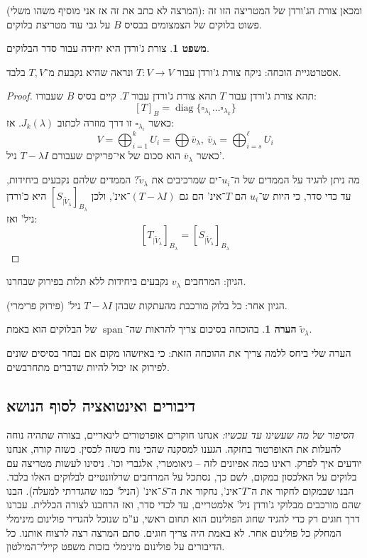 \documentclass[a4paper]{article}
\newcommand\ml    {\ell}
\DeclareMathOperator{\diag}    {diag}
\DeclareMathOperator{\Sp}      {span}
\newcommand\co        {\colon}
\renewcommand\lg      {\lambda}
\newcommand\tl    {\tilde}
\newcommand\csb[1]    {\left [ #1 \right ]}
\theoremstyle{definition}
\newtheorem{Theorem}{משפט}
\newtheorem{Remark}{הערה}
\newcommand\theo  [1] {\begin{Theorem}#1\end{Theorem}}
\newcommand\rmark [1] {\begin{Remark}#1\end{Remark}}
\begin{document}
	(המרצה לא כתב את זה אז אני מוסיף משהו משלי): ומכאן צורת הג'ורדן של המטריצה הזו זה פשוט בלוקים של הצמצומים בבסיס $B$ על גבי עוד מטריצת בלוקים. 
	
	\theo{צורת ג'ורדן היא יחידה עבור סדר הבלוקים. }אסטרטגיית הוכחה: ניקח צורת ג'ורדן עבור $T \co V \to V$ ונראה שהיא נקבעת מ־$T, V$ בלבד. 
	\begin{proof}
		תהא צורת ג'ורדן עבור $T$ תהא צורת ג'ורדן עבור $T$. קיים בסיס $B$ שעבורו: 
		\[ [T]_B = \diag\{\square_{\lg_1} \dots \square_{\lg_k}\} \]
		כאשר $\square_{\lg_i}$ זו דרך מוזרה לכתוב $J_k(\lg)$. 
		אז: 
		\[ V = \bigoplus_{i = 1}^{k} U_i = \bigoplus \bar v_{\lg}, \ \bar v_{\lg} = \bigoplus_{i = s}^{\ml} U_i \]
		כאשר $\bar v_{\lg}$ הוא סכום של אי־פריקים שעבורם $T - \lg I$ ניל'. 
		
		מה ניתן להגיד על הממדים של ה־$u_i$־ים שמרכיבים את $\tl v_\lg$? הממדים שלהם נקבעים ביחידות, עד כדי סדר, כי היות ש־$u_i$ הם $T$־אינ' הם גם $(T - \lg I)$־אינ', ולכן $[S_{|\tl V_\lg}]_{B_\lg}$ היא כ'ורדן ניל' ואז: 
		\[ \csb{T_{|\tl V_\lg}}_{B_\lg} = \csb{S_{|\tl V_\lg}}_{B_\lg} \]
	\end{proof}
	
	הגיון: המרחבים $v_\lg$ נקבעים ביחידות ללא תלות בפירוק שבחרנו. 
	
	הגיון אחר: כל בלוק מורכבת מהעתקות שבהן $T - \lg I$ ניל' (פירוק פרימרי). 
	
	\rmark{בהוכחה בסיכום צריך להראות שה־$\Sp$ של הבלוקים הוא באמת $\tl v_\lg$. }
	
	הערה שלי ביחס ללמה צריך את ההוכחה הזאת: כי באיזשהו מקום אם נבחר בסיסים שונים לפירוק אז יכול להיות שדברים מתחרבשים. 
	
	\subsection{דיבורים ואינטואציה לסוף הנושא}
	
	\textit{הסיפור של מה שעשינו עד עכשיו: }אנחנו חוקרים אופרטורים לינאריים, בצורה שתהיה נוחה להעלות את האופרטור בחזקה. הגענו למסקנה שהכי נוח כשזה לכסין. כשזה קורה, אנחנו יודעים איך לפרק. ראינו כמה אפיונים לזה – גיאומטרי, אלגברי וכו'. ניסינו לעשות מטריצה עם בלוקים על האלכסון במקום, לשם כך, נסתכל על המרחבים שרלוונטיים לבלוקים האלו בלבד. הבנו שבמקום לחקור את ה־$T$־אינ', נחקור את ה־$S$־אינ' (הניל' כמו שהגדרתי למעלה). הבנו שהם מורכבים מבלוקי ג'ורדן ניל' אלמטריים, עד לכדי סדר, ואז הרחבנו לצורה הכללית. עברנו דרך חוגים רק כדי להגיד שחוג הפולינום הוא תחום ראשי, ע''מ שנוכל להגדיר פולינום מינימלי המחלק כל פולינום אחר. לא באמת היה צריך חוגים. סתם המרצה רצה לרצוח אותנו. כל הדיבורים על פולינום מינימלי בזכות משפט קיילי־המילטון. 
	
\end{document}
